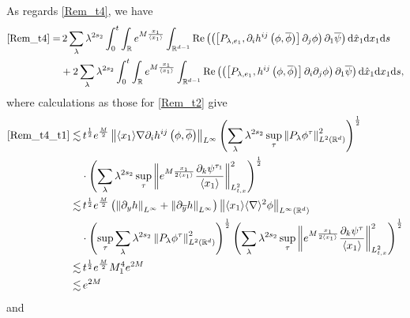 \documentclass[10pt,twoside,a4paper]{article}
\numberwithin{equation}{section}\allowdisplaybreaks
\begin{document}
As regards \eqref{Rem_t4}, we have
\begin{align}
	\eqref{Rem_t4} =&\,2\sum_{\lambda} \lambda^{ 2s_2}\int_0^t	\int_{\mathbb{R}}e^{M \frac{x_1}{\langle x_1\rangle} }   \int_{\mathbb{R}^{d-1}}  \mathrm{Re} \left(   \left(\left[P_{\lambda, e_1},\partial_i h^{ij}\left(\phi,\overline{\phi}\right) \right]  \partial_j  \phi \right)\partial_1  \overline{\psi}\right)   \mathrm{d} \hat{x}_1  \mathrm{d} x_1 \mathrm{d} s\label{Rem_t4_t1}\\
	&+2\sum_{\lambda} \lambda^{ 2s_2}\int_0^t	\int_{\mathbb{R}}e^{M \frac{x_1}{\langle x_1\rangle} }   \int_{\mathbb{R}^{d-1}}  \mathrm{Re} \left(   \left(\left[P_{\lambda, e_1}, h^{ij}\left(\phi,\overline{\phi}\right) \right]  \partial_i\partial_j  \phi \right)\partial_1  \overline{\psi}\right)   \mathrm{d} \hat{x}_1  \mathrm{d} x_1 \mathrm{d} s, \label{Rem_t4_t2}
\end{align}
where calculations as those for \eqref{Rem_t2} give
\begin{align*}
	\eqref{Rem_t4_t1} \lesssim &\, t^{\frac 12} e^{\frac M2} \left\| \langle x_1 \rangle \nabla \partial_i h^{ij}\left(\phi,\overline{\phi}\right) \right\|_{L^\infty}\left(\sum_{\lambda} \lambda^{ 2s_2} \sup_\tau \left\|  P_\lambda \phi^{\tau }\right\|_{L^{2}(\mathbb{R}^d)}^2\right )^{\frac 12}\\
 &\cdot\left(\sum_{\lambda} \lambda^{ 2s_2}\sup_\tau \left\| e^{M \frac{x_1}{2\langle x_1\rangle} } \frac{\partial_k \psi^{\tau_1} }{\langle x_1\rangle }  \right\|_{L^2_{t,x}}^2\right)^{\frac 12}\\
	\lesssim & \,t^{\frac 12} e^{\frac M2} \left(\left\|   \partial_y h \right\|_{L^{\infty}}+\left\|   \partial_{\overline{y}} h \right\|_{L^{\infty} } \right) \left\| \langle x_1\rangle \langle\nabla\rangle^2 \phi \right\|_{L^{\infty}(\mathbb{R}^d)}   \\
  &\cdot\left(\sup_\tau \sum_{\lambda} \lambda^{ 2s_2} \left\|  P_\lambda \phi^\tau\right\|_{L^{2}(\mathbb{R}^d)}^2\right)^{\frac 12} \left(\sum_{\lambda} \lambda^{ 2s_2}\sup_\tau \left\| e^{M \frac{x_1}{2\langle x_1\rangle} } \frac{\partial_k \psi^\tau }{\langle x_1\rangle }  \right\|_{L^2_{t,x}}^2\right)^{\frac 12}\\
	\lesssim&\, t^{\frac 12} e^{\frac M2} M_1^4 e^{2M}\\
	\lesssim&\, e^{2M}
\end{align*}
and 
\end{document}
